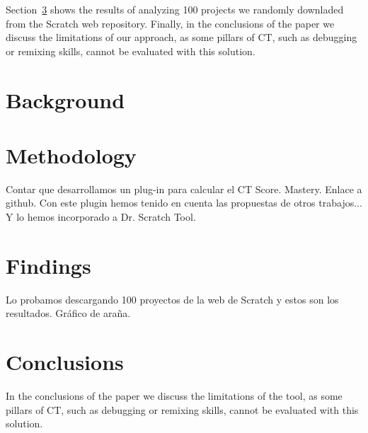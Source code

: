 \documentclass[a4paper,11pt]{article}
\begin{document}
Section~\ref{sec:findings} shows the results of analyzing 100 projects we randomly downladed from the Scratch web repository. Finally, in the conclusions of the paper we discuss the limitations of our approach, as some pillars of CT, such as debugging or remixing skills, cannot be evaluated with this solution.


\section{Background}
\label{sec:background}



\section{Methodology}
\label{sec:methodology}

Contar que desarrollamos un plug-in para calcular el CT Score. Mastery. Enlace a github. Con este plugin hemos tenido en cuenta las propuestas de otros trabajos... Y lo hemos incorporado a Dr. Scratch Tool.

\section{Findings}
\label{sec:findings}

Lo probamos descargando 100 proyectos de la web de Scratch y estos son los resultados. Gráfico de araña.

\section{Conclusions}
\label{sec:conclusions}

In the conclusions of the paper we discuss the limitations of the tool, as some pillars of CT, such as debugging or remixing skills, cannot be evaluated with this solution.

\newpage


\end{document}
